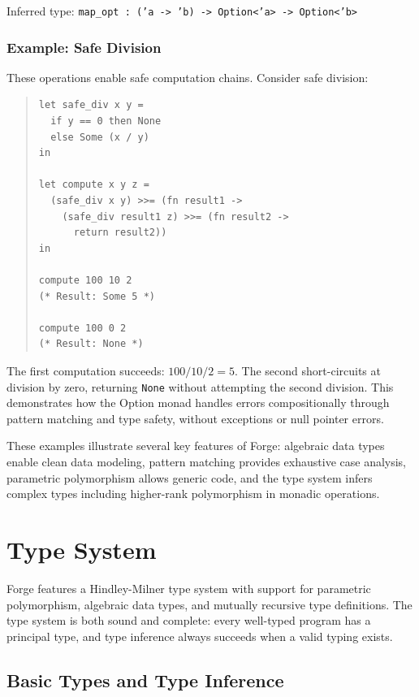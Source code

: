 \documentclass[conference,onecolumn]{IEEEtran}
\begin{document}
Inferred type: \texttt{map\_opt : ('a -> 'b) -> Option<'a> -> Option<'b>}

\subsubsection{Example: Safe Division}

These operations enable safe computation chains. Consider safe division:

\begin{quote}
\small
\begin{verbatim}
let safe_div x y =
  if y == 0 then None
  else Some (x / y)
in

let compute x y z =
  (safe_div x y) >>= (fn result1 ->
    (safe_div result1 z) >>= (fn result2 ->
      return result2))
in

compute 100 10 2
(* Result: Some 5 *)

compute 100 0 2
(* Result: None *)
\end{verbatim}
\end{quote}

The first computation succeeds: $100 / 10 / 2 = 5$. The second short-circuits at division by zero, returning \texttt{None} without attempting the second division. This demonstrates how the Option monad handles errors compositionally through pattern matching and type safety, without exceptions or null pointer errors.

These examples illustrate several key features of Forge: algebraic data types enable clean data modeling, pattern matching provides exhaustive case analysis, parametric polymorphism allows generic code, and the type system infers complex types including higher-rank polymorphism in monadic operations.

\newpage
\section{Type System}

Forge features a Hindley-Milner type system with support for parametric polymorphism, algebraic data types, and mutually recursive type definitions. The type system is both sound and complete: every well-typed program has a principal type, and type inference always succeeds when a valid typing exists.

\subsection{Basic Types and Type Inference}
\end{document}
